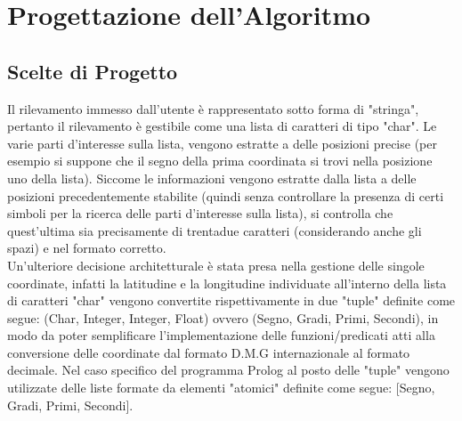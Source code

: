 \documentclass{article}
\begin{document}
\section{Progettazione dell'Algoritmo}
\subsection{Scelte di Progetto}
Il rilevamento immesso dall'utente è rappresentato sotto forma di "stringa", pertanto il rilevamento è gestibile come una lista di caratteri di tipo "char". Le varie parti d'interesse sulla lista, vengono estratte a delle posizioni precise (per esempio si suppone che il segno della prima coordinata si trovi nella posizione uno della lista).  Siccome le informazioni vengono estratte dalla lista a delle posizioni precedentemente stabilite (quindi senza controllare la presenza di certi simboli per la ricerca delle parti d'interesse sulla lista), si controlla che quest'ultima sia precisamente di trentadue caratteri (considerando anche gli spazi) e nel formato corretto.\\
Un'ulteriore decisione architetturale è stata presa nella gestione delle singole coordinate, infatti la latitudine e la longitudine individuate all'interno della lista di caratteri "char" vengono convertite rispettivamente in due "tuple" definite come segue: (Char, Integer, Integer, Float) ovvero (Segno, Gradi, Primi, Secondi), in modo da poter semplificare l'implementazione delle funzioni/predicati atti alla conversione delle coordinate dal formato D.M.G internazionale al formato decimale. Nel caso specifico del programma Prolog al posto delle "tuple" vengono utilizzate delle liste formate da elementi "atomici" definite come segue:  [Segno, Gradi, Primi, Secondi].
 
\end{document}
